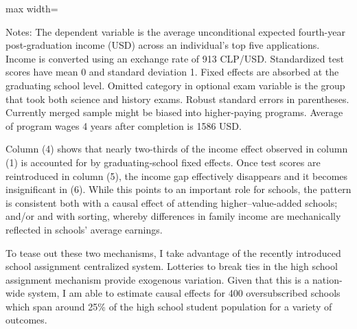 \documentclass[12pt]{article}
\newcommand{\blue}[1]{\textcolor{blue}{#1}}
\begin{document}
\begin{table}[htbp]
\centering
\caption{Differences in expected returns of college applications, conditioning on achievement}
\label{tab:income_regs}

\begin{threeparttable}
\begin{adjustbox}{max width=\textwidth}
  
\end{adjustbox}
\begin{tablenotes}[flushleft]
\footnotesize
\begin{minipage}{\textwidth}
\item Notes: The dependent variable is the average unconditional expected fourth-year post-graduation income (USD) across an individual’s top five applications. Income is converted using an exchange rate of 913 CLP/USD. Standardized test scores have mean 0 and standard deviation 1. Fixed effects are absorbed at the graduating school level. Omitted category in optional exam variable is the group that took both science and history exams. Robust standard errors in parentheses. Currently merged sample might be biased into higher-paying programs. Average of program wages 4 years after completion is 1586 USD.
\end{minipage}
\end{tablenotes}
\end{threeparttable}
\end{table}


Column (4) shows that nearly two-thirds of the income effect observed in column (1) is accounted for by graduating-school fixed effects. Once test scores are reintroduced in column (5), the income gap effectively disappears and it becomes insignificant in (6). While this points to an important role for schools, the pattern is consistent both with a causal effect of attending higher–value-added schools; and/or and with sorting, whereby differences in family income are mechanically reflected in schools’ average earnings.



To tease out these two mechanisms, I take advantage of the recently introduced school assignment centralized system. Lotteries to break ties in the high school assignment mechanism provide exogenous variation. Given that this is a nation-wide system, I am able to estimate causal effects for 400 oversubscribed schools  which span around 25\% of the high school student population for a variety of outcomes.  
\end{document}
